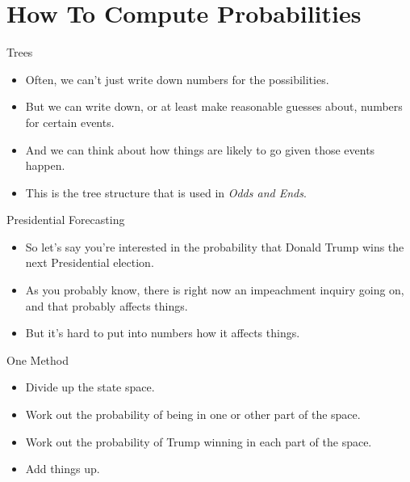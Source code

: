 \documentclass[
  ignorenonframetext,
]{beamer}
\providecommand{\tightlist}{%
  \setlength{\itemsep}{0pt}\setlength{\parskip}{0pt}}
\renewcommand{\,}{\text{, }}
\begin{document}
\hypertarget{how-to-compute-probabilities}{%
\section{How To Compute
Probabilities}\label{how-to-compute-probabilities}}

\begin{frame}{Trees}
\protect\hypertarget{trees}{}

\begin{itemize}
\tightlist
\item
  Often, we can't just write down numbers for the possibilities.
\item
  But we can write down, or at least make reasonable guesses about,
  numbers for certain events.
\item
  And we can think about how things are likely to go given those events
  happen.
\item
  This is the tree structure that is used in \emph{Odds and Ends}.
\end{itemize}

\end{frame}

\begin{frame}{Presidential Forecasting}
\protect\hypertarget{presidential-forecasting}{}

\begin{itemize}
\tightlist
\item
  So let's say you're interested in the probability that Donald Trump
  wins the next Presidential election.
\item
  As you probably know, there is right now an impeachment inquiry going
  on, and that probably affects things.
\item
  But it's hard to put into numbers how it affects things.
\end{itemize}

\end{frame}

\begin{frame}{One Method}
\protect\hypertarget{one-method}{}

\begin{itemize}
\tightlist
\item
  Divide up the state space.
\item
  Work out the probability of being in one or other part of the space.
\item
  Work out the probability of Trump winning in each part of the space.
\item
  Add things up.
\end{itemize}

\end{frame}
\end{document}

